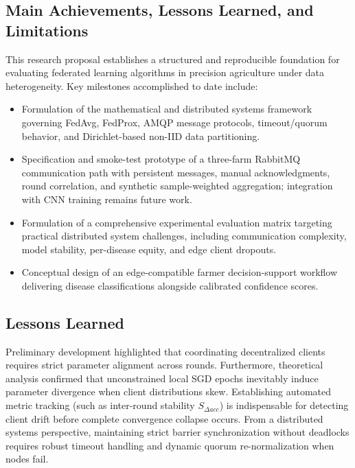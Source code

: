 \documentclass[applsci,article,submit,oneauthor,pdftex]{Definitions/mdpi}
\begin{document}
\subsection{Main Achievements, Lessons Learned, and Limitations}
This research proposal establishes a structured and reproducible foundation for evaluating federated learning algorithms in precision agriculture under data heterogeneity. Key milestones accomplished to date include:
\begin{itemize}[leftmargin=*]
    \item Formulation of the mathematical and distributed systems framework governing FedAvg, FedProx, AMQP message protocols, timeout/quorum behavior, and Dirichlet-based non-IID data partitioning.
\item Specification and smoke-test prototype of a three-farm RabbitMQ communication path with persistent messages, manual acknowledgments, round correlation, and synthetic sample-weighted aggregation; integration with CNN training remains future work.
    \item Formulation of a comprehensive experimental evaluation matrix targeting practical distributed system challenges, including communication complexity, model stability, per-disease equity, and edge client dropouts.
    \item Conceptual design of an edge-compatible farmer decision-support workflow delivering disease classifications alongside calibrated confidence scores.
\end{itemize}

\subsection{Lessons Learned}
Preliminary development highlighted that coordinating decentralized clients requires strict parameter alignment across rounds. Furthermore, theoretical analysis confirmed that unconstrained local SGD epochs inevitably induce parameter divergence when client distributions skew. Establishing automated metric tracking (such as inter-round stability $S_{\Delta acc}$) is indispensable for detecting client drift before complete convergence collapse occurs. From a distributed systems perspective, maintaining strict barrier synchronization without deadlocks requires robust timeout handling and dynamic quorum re-normalization when nodes fail.
\end{document}
